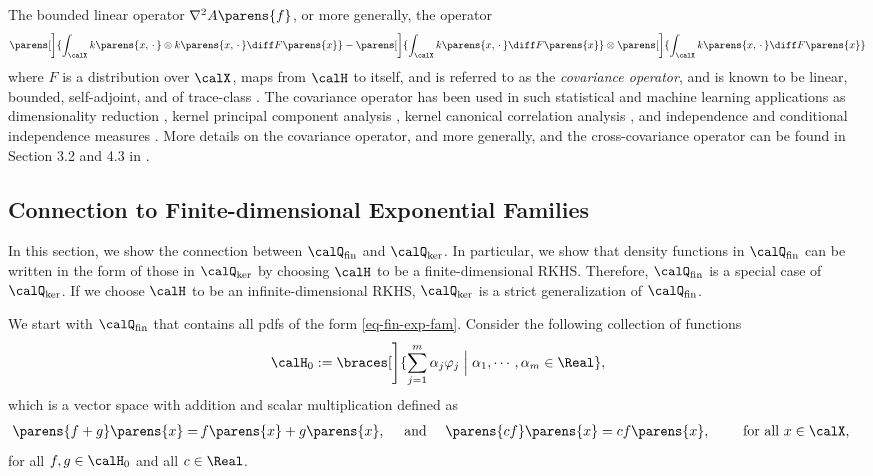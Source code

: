 \documentclass[12pt]{article}
\theoremstyle{definition}
\theoremstyle{theorem}
\theoremstyle{remark}
\begin{document}
The bounded linear operator $\nabla^2 A \parens{f}$, or more generally, the operator 
\begin{align}
	\parens[\bigg]{\int_{\calX} k \parens{x, \,\cdot\,} \otimes k \parens{x, \,\cdot\,} \diff F \parens{x} } - \parens[\bigg]{\int_{\calX} k \parens{x, \,\cdot\,} \diff F \parens{x} } \otimes \parens[\bigg]{\int_{\calX} k \parens{x, \,\cdot\,} \diff F \parens{x} }
\end{align}
where $F$ is a distribution over $\calX$, maps from $\calH$ to itself, and is referred to as the \textit{covariance operator}, and is known to be linear, bounded, self-adjoint, and of trace-class \parencites{Baker1971-pu}. The covariance operator has been used in such statistical and machine learning applications as dimensionality reduction \parencites{Fukumizu2004-zw, Fukumizu2009-zh}, kernel principal component analysis \parencites{Scholkopf1998-jn}, kernel canonical correlation analysis \parencites{Fukumizu2007-rd}, and independence and conditional independence measures \parencites{Gretton2005-tj, Fukumizu2007-rc}. More details on the covariance operator, and more generally, and the cross-covariance operator can be found in Section 3.2 and 4.3 in \textcites{kernel-mean-embedding-survey-muandet}. 


\subsection{Connection to Finite-dimensional Exponential Families}\label{subsection-connection-fin-exp-fam}

In this section, we show the connection between $\calQ_{\mathrm{fin}}$ and $\calQ_{\ker}$. In particular, we show that density functions in $\calQ_{\mathrm{fin}}$ can be written in the form of those in $\calQ_{\ker}$ by choosing $\calH$ to be a finite-dimensional RKHS. Therefore, $\calQ_{\mathrm{fin}}$ is a special case of $\calQ_{\ker}$. If we choose $\calH$ to be an infinite-dimensional RKHS, $\calQ_{\ker}$ is a strict generalization of $\calQ_{\mathrm{fin}}$. 

We start with $\calQ_{\mathrm{fin}}$ that contains all pdfs of the form \eqref{eq-fin-exp-fam}. Consider the following collection of functions 
\begin{align}
	\calH_{0} := \braces[\Bigg]{\sum_{j=1}^m \alpha_j \varphi_j \Bigm| \alpha_1, \cdots, \alpha_m \in \Real}, 
\end{align}
which is a vector space with addition and scalar multiplication defined as 
\begin{align}
	\parens{f + g} \parens{x} = & \, f \parens{x} + g \parens{x}, \quad \text{ and } \quad \parens{c f} \parens{x} = c f \parens{x}, \qquad \text{ for all } x \in \calX, 
\end{align}
for all $f, g \in \calH_0$ and all $c \in \Real$. 
\end{document}
